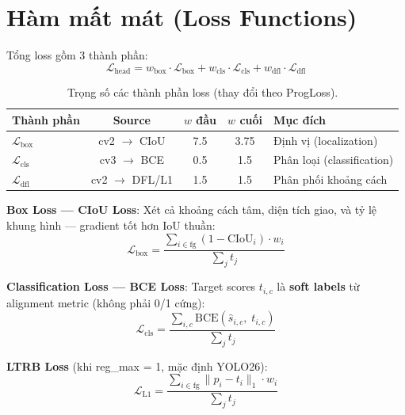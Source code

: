 \section{Hàm mất mát (Loss Functions)}
\label{sec:loss_functions}

Tổng loss gồm 3 thành phần:
\begin{equation}
    \mathcal{L}_{\text{head}} = w_{\text{box}} \cdot \mathcal{L}_{\text{box}} + w_{\text{cls}} \cdot \mathcal{L}_{\text{cls}} + w_{\text{dfl}} \cdot \mathcal{L}_{\text{dfl}}
    \label{eq:total_loss}
\end{equation}

\begin{table}[H]
\centering
\caption{Trọng số các thành phần loss (thay đổi theo ProgLoss).}
\label{tab:loss_weights}
\begin{tabular}{lcccl}
\toprule
\textbf{Thành phần} & \textbf{Source} & \textbf{$w$ đầu} & \textbf{$w$ cuối} & \textbf{Mục đích} \\
\midrule
$\mathcal{L}_{\text{box}}$ & cv2 $\to$ CIoU & 7.5 & 3.75 & Định vị (localization) \\
$\mathcal{L}_{\text{cls}}$ & cv3 $\to$ BCE & 0.5 & 1.5 & Phân loại (classification) \\
$\mathcal{L}_{\text{dfl}}$ & cv2 $\to$ DFL/L1 & 1.5 & 1.5 & Phân phối khoảng cách \\
\bottomrule
\end{tabular}
\end{table}

\textbf{Box Loss --- CIoU Loss}: Xét cả khoảng cách tâm, diện tích giao, và tỷ lệ khung hình --- gradient tốt hơn IoU thuần:
\begin{equation}
    \mathcal{L}_{\text{box}} = \frac{\sum_{i \in \text{fg}} (1 - \text{CIoU}_i) \cdot w_i}{\sum_j t_j}
\end{equation}

\textbf{Classification Loss --- BCE Loss}: Target scores $t_{i,c}$ là \textbf{soft labels} từ alignment metric (không phải 0/1 cứng):
\begin{equation}
    \mathcal{L}_{\text{cls}} = \frac{\sum_{i,c} \text{BCE}(\hat{s}_{i,c}, \; t_{i,c})}{\sum_j t_j}
\end{equation}

\textbf{LTRB Loss} (khi reg\_max = 1, mặc định YOLO26):
\begin{equation}
    \mathcal{L}_{\text{L1}} = \frac{\sum_{i \in \text{fg}} \|p_i - t_i\|_1 \cdot w_i}{\sum_j t_j}
\end{equation}


